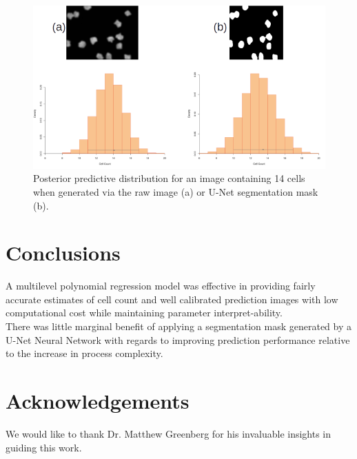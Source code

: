 \documentclass[isoft]{poster_class_UofC}
\begin{document}
\begin{poster}
             \vspace{1cm}
           \begin{figure}
            \centering
            \captionsetup{type=figure}
            \includegraphics[scale=1.7]{./images/PostPredDist.png}
            \caption{Posterior predictive distribution for an image containing 14 cells when generated via the raw image (a) or U-Net segmentation mask (b).}
            \label{fig:PostPredDist}
        \end{figure}   
            \vspace{1cm}
            
    
        \section{Conclusions}
A multilevel polynomial regression model was effective in providing fairly accurate estimates of cell count and well calibrated prediction images with low computational cost while maintaining parameter interpret-ability. \\

There was little marginal benefit of applying a segmentation mask generated by a U-Net Neural Network with regards to improving prediction performance relative to the increase in process complexity.
  
        \section{Acknowledgements}
We would like to thank Dr. Matthew Greenberg for his invaluable insights in guiding this work.  

        
        
    
    
    \end{poster}
\end{document}
